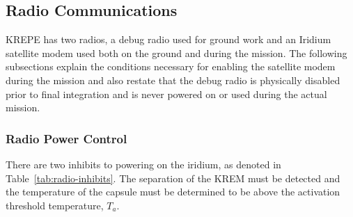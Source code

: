 \documentclass{article}
\begin{document}
%    
\fi
\subsection{Radio Communications}

KREPE has two radios, a debug radio used for ground work and an Iridium satellite modem used both on the ground and during the mission. The following subsections explain the conditions necessary for enabling the satellite modem during the mission and also restate that the debug radio is physically disabled prior to final integration and is never powered on or used during the actual mission.

\subsubsection{Radio Power Control}
\label{sec:radio-power-control}
There are two inhibits to powering on the iridium, as denoted in Table~\ref{tab:radio-inhibits}. The separation of the KREM must be detected and the temperature of the capsule must be determined to be above the activation threshold temperature, $T_a$.
\end{document}
